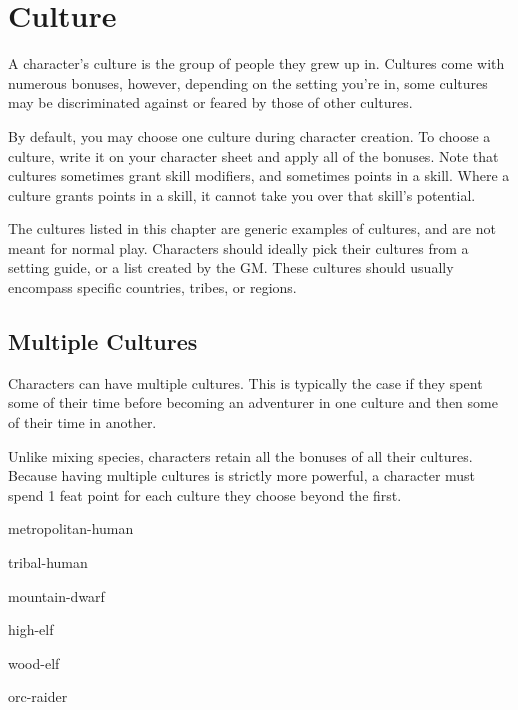 \chapter{Culture}\label{culture}

\begin{multicols*}{2}
    A character's culture is the group of people they grew up in. Cultures come
    with numerous bonuses, however, depending on the setting you're in, some
    cultures may be discriminated against or feared by those of other cultures.

    By default, you may choose one culture during character creation. To choose a
    culture, write it on your character sheet and apply all of the bonuses. Note
    that cultures sometimes grant skill modifiers, and sometimes points in a skill.
    Where a culture grants points in a skill, it cannot take you over that skill's
    potential.

    The cultures listed in this chapter are generic examples of cultures, and are
    not meant for normal play. Characters should ideally pick their cultures from
    a setting guide, or a list created by the GM. These cultures should usually
    encompass specific countries, tribes, or regions.

    \section{Multiple Cultures}
    Characters can have multiple cultures. This is typically the case if they spent
    some of their time before becoming an adventurer in one culture and then some
    of their time in another.

    Unlike mixing species, characters retain all the bonuses of all their cultures.
    Because having multiple cultures is strictly more powerful, a character must
    spend 1 feat point for each culture they choose beyond the first.

    {metropolitan-human}

    {tribal-human}

    {mountain-dwarf}

    {high-elf}

    {wood-elf}

    {orc-raider}
\end{multicols*}

